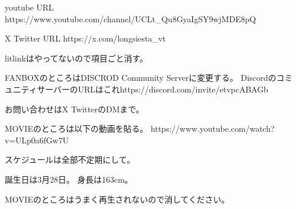 youtube URL
https://www.youtube.com/channel/UCLt_Qu8GyaIgSY9wjMDE8pQ

X Twitter URL
https://x.com/longsiesta_vt

litlinkはやってないので項目ごと消す。

FANBOXのところはDISCROD Community Serverに変更する。
DiscordのコミュニティサーバーのURLはこれhttps://discord.com/invite/etvpcABAGb

お問い合わせはX TwitterのDMまで。

MOVIEのところは以下の動画を貼る。
https://www.youtube.com/watch?v=ULp0a6fGw7U


スケジュールは全部不定期にして。

誕生日は3月28日。
身長は163cm。

MOVIEのところはうまく再生されないので消してください。